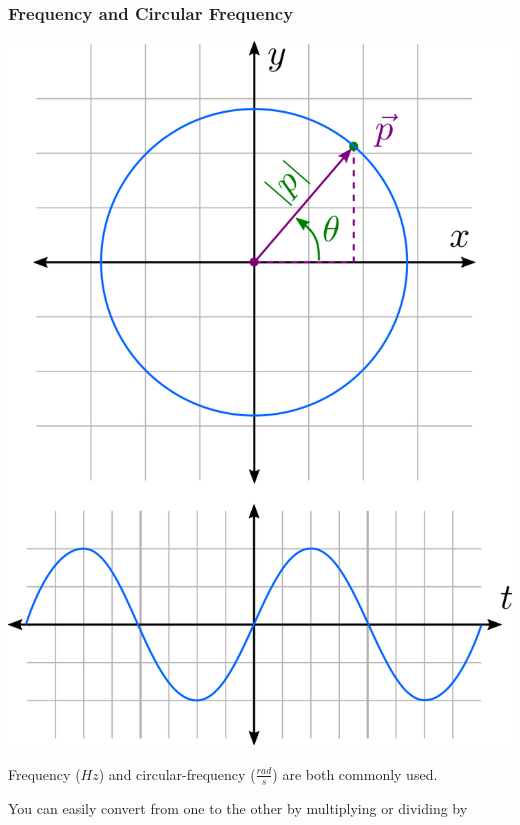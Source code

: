 \documentclass[fleqn]{beamer} %
\newcommand{\sectionIIsubsectionIIItitle}{Frequency and Circular Frequency}
\begin{document}
			\begin{frame}
				\frametitle{\sectionIIsubsectionIIItitle}
				\bigskip

				\begin{multicols}{2}

				\includegraphics[scale=.16]{images/circular_frequency_fig2.png}

				Frequency ($Hz$) and circular-frequency ($\frac{rad}{s}$) are both commonly used. \vspace{15mm}

				You can easily convert from one to the other by multiplying or dividing by \underline{\hspace{20mm}}
				\end{multicols}

			\end{frame}

\end{document}
